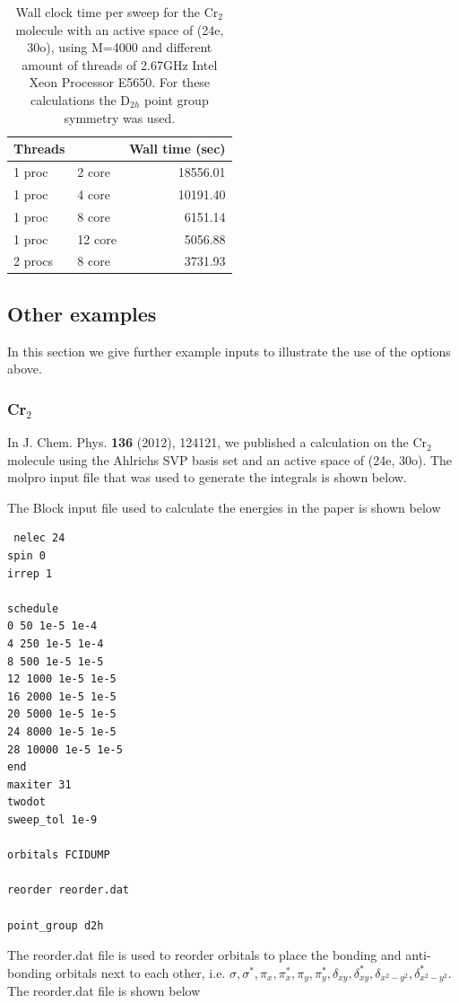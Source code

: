 \documentclass[letterpaper,12pt,aps, pra]{revtex4-1}
\begin{document}
\begin{table}
\begin{center}
\begin{tabular}{llr}
\hline
\hline
Threads && Wall time (sec)\\
\hline
1 proc &2 core  &18556.01\\
1 proc &4 core  &10191.40\\
1 proc &8 core  &6151.14\\
1 proc &12 core &5056.88\\
2 procs &8 core &3731.93\\
\hline
\hline
\end{tabular}
\end{center}
\caption{Wall clock time per sweep for the Cr$_2$ molecule with an
active space of (24e, 30o), using M=4000 and different amount of
threads of 2.67GHz Intel Xeon Processor E5650. For these calculations
the D$_{2h}$ point group symmetry was used.} \label{tab:thread}
\end{table}


\subsection{Other examples}
In this section we give further example inputs to illustrate
the use of the options above.

\subsubsection{Cr$_2$}\label{sec:cr2}

In J. Chem. Phys. \textbf{136} (2012), 124121, we published a calculation on
the Cr$_2$ molecule using the Ahlrichs SVP basis set and an active space of
(24e, 30o). The molpro input file that was used to generate the integrals is
shown below. 

The Block input file used to calculate the energies in the paper is shown below
\begin{verbatim}
 nelec 24
spin 0
irrep 1

schedule
0 50 1e-5 1e-4
4 250 1e-5 1e-4
8 500 1e-5 1e-5
12 1000 1e-5 1e-5
16 2000 1e-5 1e-5
20 5000 1e-5 1e-5
24 8000 1e-5 1e-5
28 10000 1e-5 1e-5
end
maxiter 31
twodot
sweep_tol 1e-9

orbitals FCIDUMP

reorder reorder.dat

point_group d2h
\end{verbatim}

The reorder.dat file is used to reorder orbitals to place the bonding and anti-bonding orbitals next to each other, i.e. {$\sigma, \sigma^*, \pi_x, \pi_x^*, \pi_y, \pi_y^*, \delta_{xy}, \delta_{xy}^*, \delta_{x^2-y^2}, \delta_{x^2-y^2}^*$}. The reorder.dat file is shown below\\
\end{document}

